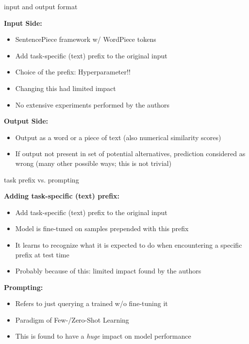 \begin{frame}{input and output format}

\vfill

	\textbf{Input Side:}

	\begin{itemize}
		\item SentencePiece framework w/ WordPiece tokens
		\item Add task-specific (text) prefix to the original input
		\item Choice of the prefix: Hyperparameter!! 
		\item[$\to$] Changing this had limited impact
		\item[$\to$] No extensive experiments performed by the authors
	\end{itemize}
	
	\vspace{.5cm}

	\textbf{Output Side:}

	\begin{itemize}
		\item Output as a word or a piece of text (also numerical similarity scores)
		\item If output not present in set of potential alternatives, prediction considered as wrong (many other possible ways; this is not trivial)
	\end{itemize}
	
\vfill

\end{frame}


\begin{frame}{task prefix vs. prompting}

\vfill

	\textbf{Adding task-specific (text) prefix:}

	\begin{itemize}
		\item Add task-specific (text) prefix to the original input
		\item Model is fine-tuned on samples prepended with this prefix
		\item[$\to$] It learns to recognize what it is expected to do when encountering a specific prefix at test time
		\item[$\to$] Probably because of this: limited impact found by the authors
	\end{itemize}
	
	\vspace{.5cm}

	\textbf{Prompting:}

	\begin{itemize}
		\item Refers to just querying a trained w/o fine-tuning it
		\item Paradigm of Few-/Zero-Shot Learning
		\item This is found to have a \textit{huge} impact on model performance
	\end{itemize}
	
\vfill

\end{frame}


